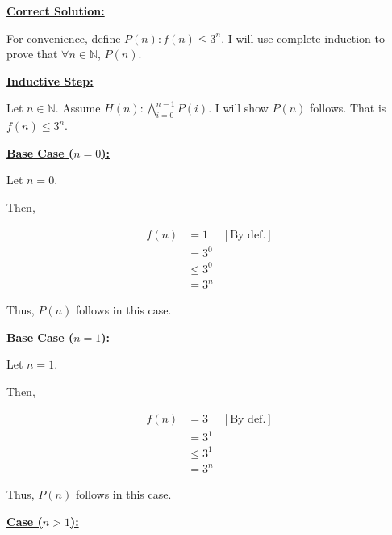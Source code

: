 \documentclass[12pt]{article}
\begin{document}
\begin{mdframed}
    \underline{\textbf{Correct Solution:}}

    \bigskip

    For convenience, define $P(n): f(n) \leq 3^n$. I will use complete induction to
    prove that $\forall n \in \mathbb{N}$, $P(n)$.

    \bigskip

    \underline{\textbf{Inductive Step:}}

    \bigskip

    Let $n \in \mathbb{N}$. Assume $H(n): \bigwedge_{i=0}^{n-1} P(i)$. I will
    show $P(n)$ follows. That is $f(n) \leq 3^n$.

    \bigskip

    \underline{\textbf{Base Case ($n = 0$):}}

    \bigskip

    Let $n = 0$.

    \bigskip

    Then,

    \begin{align}
        f(n) &= 1 & [\text{By def.}]\\
        &= 3^0\\
        &\leq 3^0\\
        &= 3^n
    \end{align}

    \bigskip

    Thus, $P(n)$ follows \color{red}in this case\color{black}.

    \bigskip

    \underline{\textbf{Base Case ($n = 1$):}}

    \bigskip

    Let $n = 1$.

    \bigskip

    Then,

    \begin{align}
        f(n) &= 3 & [\text{By def.}]\\
        &= 3^1\\
        &\leq 3^1\\
        &= 3^n
    \end{align}

    \bigskip

    Thus, $P(n)$ follows \color{red}in this case\color{black}.

    \bigskip

    \underline{\textbf{Case ($n > 1$):}}


\end{mdframed}
\end{document}
